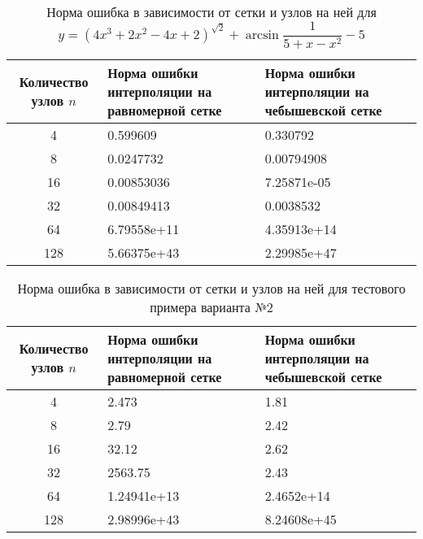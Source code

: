 \documentclass{article}
\begin{document}
    \begin{table}[H]
        \centering
        \caption{Норма ошибка в зависимости от сетки и узлов на ней для $y = (4x^3 + 2x^2 - 4x + 2 )^{\sqrt{2}} + \arcsin{\dfrac{1}{5+x - x^2}} - 5$}
        \begin{tabular}{|c|p{5cm}|p{5cm}|}
            \hline
            Количество узлов $n$ & Норма ошибки интерполяции
            на равномерной сетке & Норма ошибки интерполяции
            на чебышевской сетке \\
            \hline 
            4 &  0.599609 &  0.330792 \\ \hline
            8 &  0.0247732 & 0.00794908\\ \hline
            16 &0.00853036 & 7.25871e-05\\ \hline
            32 & 0.00849413 & 0.0038532\\ \hline
            64 & 6.79558e+11 & 4.35913e+14\\ \hline
            128 & 5.66375e+43&  2.29985e+47\\ \hline
        \end{tabular}
    \end{table}
    \begin{table}[H]
        \centering
        \caption{Норма ошибка в зависимости от сетки и узлов на ней для тестового примера варианта №2}
        \begin{tabular}{|c|p{5cm}|p{5cm}|}
            \hline
            Количество узлов $n$ & Норма ошибки интерполяции
            на равномерной сетке & Норма ошибки интерполяции
            на чебышевской сетке \\
            \hline 
            4 & 2.473 &  1.81 \\ \hline
            8 & 2.79 & 2.42\\ \hline
            16 &32.12 & 2.62\\ \hline
            32 & 2563.75 & 2.43\\ \hline
            64 &1.24941e+13 & 2.4652e+14\\ \hline
            128 & 2.98996e+43&  8.24608e+45\\ \hline
        \end{tabular}
    \end{table}
    
\end{document}
